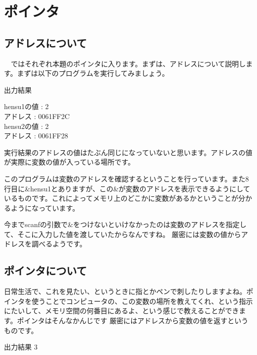 ﻿\section{ポインタ}
\subsection{アドレスについて}
　ではそれぞれ本題のポインタに入ります。まずは、アドレスについて説明します。まずは以下のプログラムを実行してみましょう。



\begin{itembox}{出力結果}

hensu1の値 : 2\\
アドレス : 0061FF2C\\
hensu2の値 : 2 \\
アドレス : 0061FF28
\end{itembox}
実行結果のアドレスの値はたぶん同じになっていないと思います。アドレスの値が実際に変数の値が入っている場所です。

このプログラムは変数のアドレスを確認するということを行っています。また8行目に\&hensu1とありますが、この\&が変数のアドレスを表示できるようにしているものです。これによってメモリ上のどこかに変数があるかということが分かるようになっています。

今までscanfの引数で\&をつけないといけなかったのは変数のアドレスを指定して、そこに入力した値を渡していたからなんですね。
厳密には変数の値からアドレスを調べるようです。

\subsection{ポインタについて}
日常生活で、これを見たい、というときに指とかペンで刺したりしますよね。ポインタを使うことでコンピュータの、この変数の場所を教えてくれ、という指示にたいして、メモリ空間の何番目にあるよ、という感じで教えることができます。ポインタはそんなかんじです
厳密にはアドレスから変数の値を返すというものです。



\begin{itembox}{出力結果}
3
\end{itembox}







